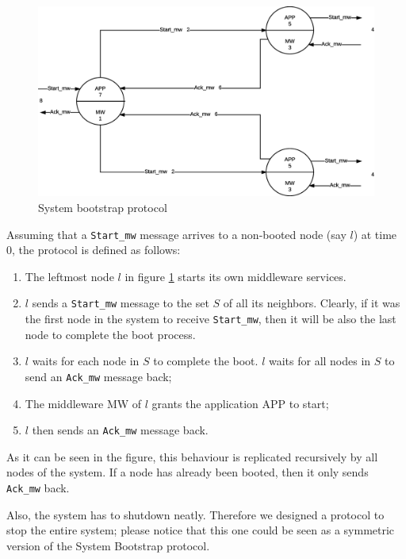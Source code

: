 \begin{figure}[H]
  \centering
  \includegraphics[width=\columnwidth]{sections/images/solution/bootstrap.eps}
  \caption{System bootstrap protocol}
  \label{fig:sys-bootstrap-protocol}
\end{figure}

Assuming that a \texttt{Start\_mw} message arrives to a non-booted node (say
$l$) at time 0, the protocol is defined as follows:

\begin{enumerate}
  \item The leftmost node $l$ in figure \ref{fig:sys-bootstrap-protocol}
    starts its own middleware services.  
  \item $l$ sends a \texttt{Start\_mw} message to the set $S$ of all its
    neighbors. Clearly, if it was the first node in the system to receive
    \texttt{Start\_mw}, then it will be also the last node to complete the
    boot process.
  \item $l$ waits for each node in $S$ to complete the boot. $l$ waits for all
nodes in $S$ to send an \texttt{Ack\_mw} message back;
  \item The middleware MW of $l$ grants the application APP to start;
  \item $l$ then sends an \texttt{Ack\_mw} message back.
\end{enumerate}

As it can be seen in the figure, this behaviour is replicated recursively
by all nodes of the system. If a node has already been booted, then it only
sends \texttt{Ack\_mw} back.

Also, the system has to shutdown neatly. Therefore we designed a protocol to
stop the entire system; please notice that this one could be seen as a
symmetric version of the System Bootstrap protocol.

